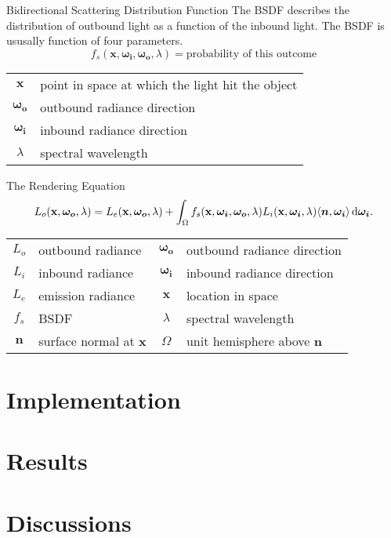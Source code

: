 \documentclass[10pt]{beamer}
\DeclarePairedDelimiter\ip{\langle }{\rangle}
\begin{document}
\begin{frame}{Bidirectional Scattering Distribution Function}
  The BSDF describes the distribution of outbound light as a function of the inbound light.
  The BSDF is ususally function of four parameters.
  \[f_s(\mathbf x, \bm{\omega_i}, \bm{\omega_o}, \lambda) = \text{probability of this outcome}\]

  \hrulefill

  \begin{center}
    \begin{tabu}{cl}
      \(\mathbf x\) & point in space at which the light hit the object\\
      \(\bm{\omega_o}\) & outbound radiance direction\\
      \(\bm{\omega_i}\) & inbound radiance direction\\
      \(\lambda\) & spectral wavelength\\
    \end{tabu}
  \end{center}

\end{frame}

\begin{frame}{The Rendering Equation}
  \[L_{o}(\mathbf x, \bm {\omega_{o}}, \lambda) = L_{e}(\mathbf x, \bm{\omega_o}, \lambda) + \int_\Omega f_s(\mathbf x, \bm{\omega_i}, \bm{\omega_o}, \lambda)L_i(\mathbf x, \bm{\omega_i}, \lambda)\ip{\bm n, \bm{\omega_i}} \dif \bm{\omega_i}.\]

  \hrulefill

  \begin{center}
    \begin{tabu}{clcl}
      \(L_{o}\)& outbound radiance & \(\bm{\omega_o}\)& outbound radiance direction\\
      \(L_{i}\)& inbound radiance & \(\bm{\omega_i}\) &inbound radiance direction\\
      \(L_{e}\)& emission radiance & \(\mathbf x\) &location in space\\
      \(f_s\) & BSDF & \(\lambda\)& spectral wavelength\\
       \(\bm n\)& surface normal at \(\mathbf x\) & \(\Omega\) & unit hemisphere above \(\bm n\)
    \end{tabu}
  \end{center}
\end{frame}

\section{Implementation}
\section{Results}
\section{Discussions}
\end{document}

